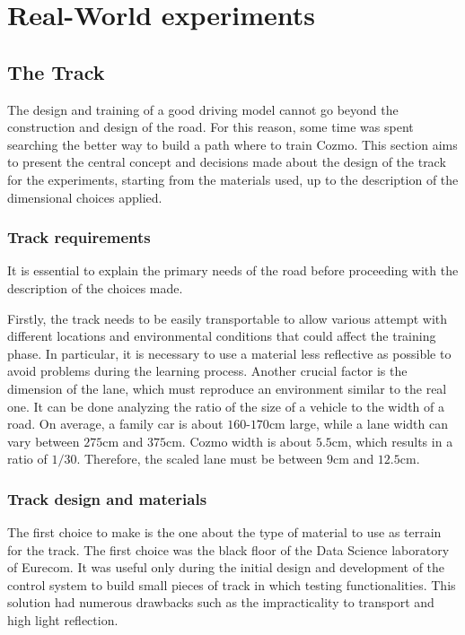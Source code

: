 \section{Real-World experiments}

\subsection{The Track}

The design and training of a good driving model cannot go beyond the construction and design of the road.
For this reason, some time was spent searching the better way to build a path where to train Cozmo.
This section aims to present the central concept and decisions made about the design of the track for the experiments, starting from the materials used, up to the description of the dimensional choices applied.

\subsubsection{Track requirements}

It is essential to explain the primary needs of the road before proceeding with the description of the choices made.

Firstly, the track needs to be easily transportable to allow various attempt with different locations and environmental conditions that could affect the training phase.
In particular, it is necessary to use a material less reflective as possible to avoid problems during the learning process.
Another crucial factor is the dimension of the lane, which must reproduce an environment similar to the real one.
It can be done analyzing the ratio of the size of a vehicle to the width of a road.
On average, a family car is about $160$-$170$cm large, while a lane width can vary between $275$cm and $375$cm.
Cozmo width is about $5.5$cm, which results in a ratio of $1/30$.
Therefore, the scaled lane must be between $9$cm and $12.5$cm.

\subsubsection{Track design and materials}

The first choice to make is the one about the type of material to use as terrain for the track.
The first choice was the black floor of the Data Science laboratory of Eurecom.
It was useful only during the initial design and development of the control system to build small pieces of track in which testing functionalities.
This solution had numerous drawbacks such as the impracticality to transport and high light reflection.


